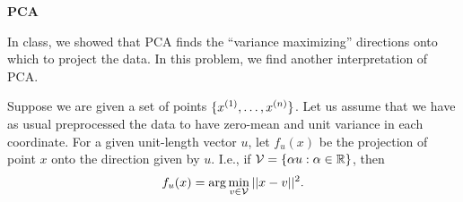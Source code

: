 \item {} {\bf PCA} 

In class, we showed that PCA finds the ``variance maximizing'' directions onto
which to project the data.  In this problem, we find another interpretation of PCA. 

Suppose we are given a set of points $\{x^{(1)},\ldots,x^{(\nexp)}\}$. Let us
assume that we have as usual preprocessed the data to have zero-mean and unit variance
in each coordinate.  For a given unit-length vector $u$, let $f_u(x)$ be the 
projection of point $x$ onto the direction given by $u$.  I.e., if 
${\cal V} = \{\alpha u : \alpha \in \Re\}$, then 
\[
f_u(x) = \arg \min_{v\in {\cal V}} ||x-v||^2.
\]





\begin{enumerate}
 	
	\ifnum{} {
	
} \fi


\ifnum{} {
	
} \fi


\end{enumerate}